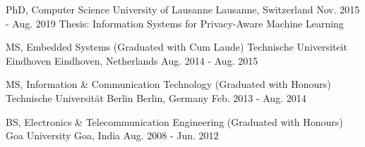

\begin{cventries}

  \vspace{-0.2cm}
  \cventry
    {PhD, Computer Science} %
    {University of Lausanne} %
    {Lausanne, Switzerland} %
    {Nov. 2015 - Aug. 2019} %
    {
      Thesis: Information Systems for Privacy-Aware Machine Learning
    }
    
    \cventry
    {MS, Embedded Systems (Graduated with Cum Laude)}
    {Technische Universiteit Eindhoven}
    {Eindhoven, Netherlands}
    {Aug. 2014 - Aug. 2015}
    {}
	
	\vspace{-0.4cm}
    \cventry
    {MS, Information \& Communication Technology (Graduated with Honours)} %
    {Technische Universität Berlin} %
    {Berlin, Germany} %
    {Feb. 2013 - Aug. 2014} %
    {}
    
	\vspace{-0.4cm}
    \cventry
    {BS, Electronics \& Telecommunication Engineering (Graduated with Honours)} %
    {Goa University} %
    {Goa, India} %
    {Aug. 2008 - Jun. 2012} %
    {}
	
	\vspace{-0.8cm}
\end{cventries}
